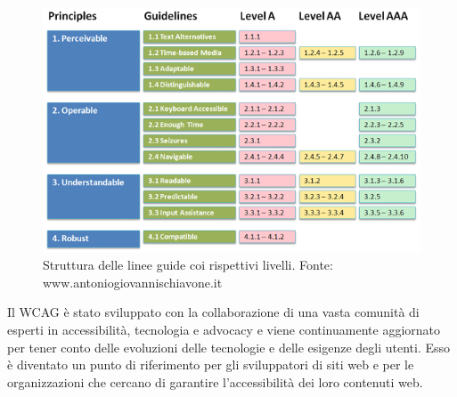 \documentclass[a4paper,final,12pt]{report}
\begin{document}
\begin{figure}[hbtp]
\centering
\includegraphics[scale=0.38]{img_concettuale/wcag.png}
\caption{Struttura delle linee guide coi rispettivi livelli. Fonte: www.antoniogiovannischiavone.it}
\end{figure}

Il WCAG è stato sviluppato con la collaborazione di una vasta comunità di esperti in accessibilità, tecnologia e advocacy e viene continuamente aggiornato per tener conto delle evoluzioni delle tecnologie e delle esigenze degli utenti. Esso è diventato un punto di riferimento per gli sviluppatori di siti web e per le organizzazioni che cercano di garantire l'accessibilità dei loro contenuti web.
\end{document}
